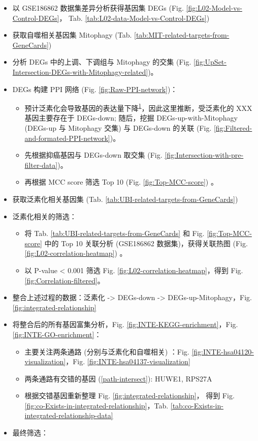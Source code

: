 \documentclass[
]{article}
\providecommand{\tightlist}{%
  \setlength{\itemsep}{0pt}\setlength{\parskip}{0pt}}
\begin{document}
\begin{itemize}
\tightlist
\item
  以 GSE186862 数据集差异分析获得基因集 DEGs (Fig. \ref{fig:L02-Model-vs-Control-DEGs}，
  Tab. \ref{tab:L02-data-Model-vs-Control-DEGs})
\item
  获取自噬相关基因集 Mitophagy (Tab. \ref{tab:MIT-related-targets-from-GeneCards})
\item
  分析 DEGs 中的上调、下调组与 Mitophagy 的交集 (Fig. \ref{fig:UpSet-Intersection-DEGs-with-Mitophagy-related})。
\item
  DEGs 构建 PPI 网络 (Fig. \ref{fig:Raw-PPI-network})：

  \begin{itemize}
  \tightlist
  \item
    预计泛素化会导致基因的表达量下降\textsuperscript{\protect\hyperlink{ref-UbiquitinationPopovi2014}{1}}，因此这里推断，受泛素化的 XXX 基因主要存在于 DEGs-down;
    随后，挖掘 DEGs-up-with-Mitophagy (DEGs-up 与 Mitophagy 交集) 与 DEGs-down 的关联
    (Fig. \ref{fig:Filtered-and-formated-PPI-network})。
  \item
    先根据抑癌基因与 DEGs-down 取交集 (Fig. \ref{fig:Intersection-with-pre-filter-data})。
  \item
    再根据 MCC score 筛选 Top 10 (Fig. \ref{fig:Top-MCC-score}) 。
  \end{itemize}
\item
  获取泛素化相关基因集 (Tab. \ref{tab:UBI-related-targets-from-GeneCards})
\item
  泛素化相关的筛选：

  \begin{itemize}
  \tightlist
  \item
    将 Tab. \ref{tab:UBI-related-targets-from-GeneCards} 和 Fig. \ref{fig:Top-MCC-score} 中的 Top 10 关联分析 (GSE186862 数据集)，获得关联热图 (Fig. \ref{fig:L02-correlation-heatmap}) 。
  \item
    以 P-value \textless{} 0.001 筛选 Fig. \ref{fig:L02-correlation-heatmap}，得到 Fig. \ref{fig:Correlation-filtered}。
  \end{itemize}
\item
  整合上述过程的数据：泛素化 -\textgreater{} DEGs-down -\textgreater{} DEGs-up-Mitophagy，Fig. \ref{fig:integrated-relationship}
\item
  将整合后的所有基因富集分析，Fig. \ref{fig:INTE-KEGG-enrichment}，Fig. \ref{fig:INTE-GO-enrichment}：

  \begin{itemize}
  \tightlist
  \item
    主要关注两条通路 (分别与泛素化和自噬相关) ：Fig. \ref{fig:INTE-hsa04120-visualization}，Fig. \ref{fig:INTE-hsa04137-visualization}
  \item
    两条通路有交错的基因 (\ref{path-intersect}): HUWE1, RPS27A
  \item
    根据交错基因重新整理 Fig. \ref{fig:integrated-relationship}，
    得到 Fig. \ref{fig:co-Exists-in-integrated-relationship}，Tab. \ref{tab:co-Exists-in-integrated-relationship-data}
  \end{itemize}
\item
  最终筛选：


\end{itemize}
\end{document}
